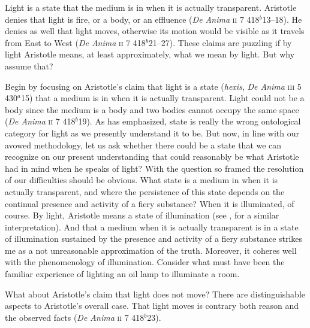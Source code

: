 Light is a state that the medium is in when it is actually transparent. Aristotle denies that light is fire, or a body, or an effluence (\emph{De Anima} \textsc{ii} 7 418\( ^{b} \)13--18). He denies as well that light moves, otherwise its motion would be visible as it travels from East to West (\emph{De Anima} \textsc{ii} 7 418\( ^{b} \)21--27). These claims are puzzling if by light Aristotle means, at least approximately, what we mean by light. But why assume that? 

Begin by focusing on Aristotle's claim that light is a state (\emph{hexis}, \emph{De Anima} \textsc{iii} 5 430\( ^{a} \)15) that a medium is in when it is actually transparent. Light could not be a body since the medium is a body and two bodies cannot occupy the same space (\emph{De Anima} \textsc{ii} 7 418\( ^{b} \)19). As \citet{Burnyeat:1995fk} has emphasized, state is really the wrong ontological category for light as we presently understand it to be. But now, in line with our avowed methodology, let us ask whether there could be a state that we can recognize on our present understanding that could reasonably be what Aristotle had in mind when he speaks of light? With the question so framed the resolution of our difficulties should be obvious. What state is a medium in when it is actually transparent, and where the persistence of this state depends on the continual presence and activity of a fiery substance? When it is illuminated, of course. By light, Aristotle means a state of illumination (see \citealt[122]{Thorp:1982fk}, for a similar interpretation). And that a medium when it is actually transparent is in a state of illumination sustained by the presence and activity of a fiery substance strikes me as a not unreasonable approximation of the truth. Moreover, it coheres well with the phenomenology of illumination. Consider what must have been the familiar experience of lighting an oil lamp to illuminate a room.

What about Aristotle's claim that light does not move? There are distinguishable aspects to Aristotle's overall case. That light moves is contrary both reason and the observed facts (\emph{De Anima} \textsc{ii} 7 418\( ^{b} \)23).

